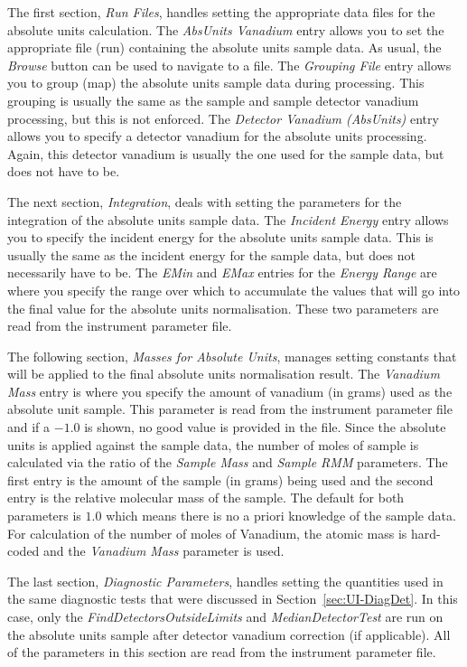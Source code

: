 The first section, \textit{Run Files}, handles setting the appropriate data files for the absolute units calculation. The \textit{AbsUnits Vanadium} entry allows you to set the appropriate file (run) containing the absolute units sample data. As usual, the \textit{Browse} button can be used to navigate to a file. The \textit{Grouping File} entry allows you to group (map) the absolute units sample data during processing. This grouping is usually the same as the sample and sample detector vanadium processing, but this is not enforced. The \textit{Detector Vanadium (AbsUnits)} entry allows you to specify a detector vanadium for the absolute units processing. Again, this detector vanadium is usually the one used for the sample data, but does not have to be. 

The next section, \textit{Integration}, deals with setting the parameters for the integration of the absolute units sample data. The \textit{Incident Energy} entry allows you to specify the incident energy for the absolute units sample data. This is usually the same as the incident energy for the sample data, but does not necessarily have to be. The \textit{EMin} and \textit{EMax} entries for the \textit{Energy Range} are where you specify the range over which to accumulate the values that will go into the final value for the absolute units normalisation. These two parameters are read from the instrument parameter file.

The following section, \textit{Masses for Absolute Units}, manages setting constants that will be applied to the final absolute units normalisation result. The \textit{Vanadium Mass} entry is where you specify the amount of vanadium (in grams) used as the absolute unit sample. This parameter is read from the instrument parameter file and if a $-1.0$ is shown, no good value is provided in the file. Since the absolute units is applied against the sample data, the number of moles of sample is calculated via the ratio of the \textit{Sample Mass} and \textit{Sample RMM} parameters. The first entry is the amount of the sample (in grams) being used and the second entry is the relative molecular mass of the sample. The default for both parameters is $1.0$ which means there is no a priori knowledge of the sample data. For calculation of the number of moles of Vanadium, the atomic mass is hard-coded and the \textit{Vanadium Mass} parameter is used.

The last section, \textit{Diagnostic Parameters}, handles setting the quantities used in the same diagnostic tests that were discussed in Section~\ref{sec:UI-DiagDet}. In this case, only the \textit{FindDetectorsOutsideLimits} and \textit{MedianDetectorTest} are run on the absolute units sample after detector vanadium correction (if applicable). All of the parameters in this section are read from the instrument parameter file.
